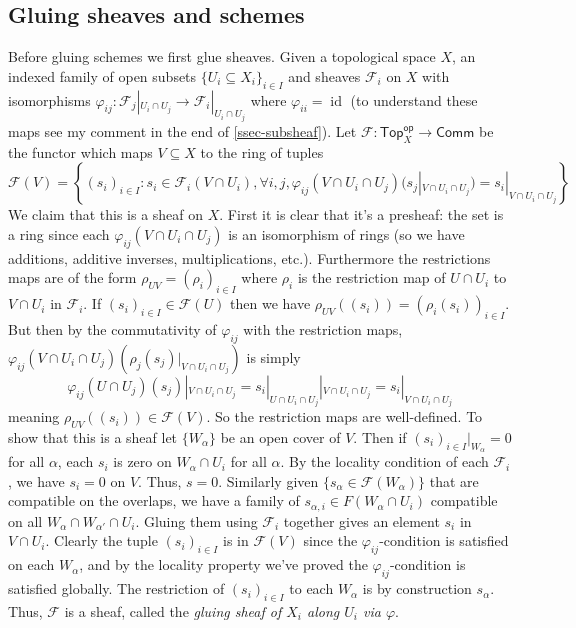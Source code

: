 \documentclass[12pt]{article}
\theoremstyle{remark}
\newcommand{\id}[0]{\operatorname{id}}
\newcommand{\Top}[0]{\mathsf{Top}}
\newcommand{\op}[0]{\mathsf{op}}
\begin{document}
	\subsection{Gluing sheaves and schemes}\label{ssec-gluing}
	Before gluing schemes we first glue sheaves. Given a topological space $X$, an indexed family of open subsets $\{U_i\subseteq X_i\}_{i\in I}$ and sheaves $\mathscr F_i$ on $X$ with isomorphisms $\varphi_{ij}:\mathscr F_j|_{U_i\cap U_j}\to \mathscr F_i|_{U_i\cap U_j}$ where $\varphi_{ii}=\id$ (to understand these maps see my comment in the end of \ref{ssec-subsheaf}). Let $\mathscr F:\Top_X^\op\to\mathsf{Comm}$ be the functor which maps $V\subseteq X$ to the ring of tuples
	\[\mathscr F(V)=\left\{(s_i)_{i\in I}:s_i\in \mathscr F_i(V\cap U_i),\forall i,j,\varphi_{ij}(V\cap U_i\cap U_j)(s_j|_{V\cap U_i\cap U_j})=s_i|_{V\cap U_i\cap U_j}\right\}\]
	We claim that this is a sheaf on $X$. First it is clear that it's a presheaf: the set is a ring since each $\varphi_{ij}(V\cap U_i\cap U_j)$ is an isomorphism of rings (so we have additions, additive inverses, multiplications, etc.). Furthermore the restrictions maps are of the form $\rho_{UV}=(\rho_i)_{i\in I}$ where $\rho_i$ is the restriction map of $U\cap U_i$ to $V\cap U_i$ in $\mathscr F_i$. If $(s_i)_{i\in I}\in \mathscr F(U)$ then we have $\rho_{UV}((s_i))=(\rho_i(s_i))_{i\in I}$. But then by the commutativity of $\varphi_{ij}$ with the restriction maps, $\varphi_{ij}(V\cap U_i\cap U_j)(\rho_j(s_j)|_{V\cap U_i\cap U_j})$ is simply 
	\[\varphi_{ij}(U\cap U_j)(s_j)|_{V\cap U_i\cap U_j}=s_i|_{U\cap U_i\cap U_j}|_{V\cap U_i\cap U_j}=s_i|_{V\cap U_i\cap U_j}\]
	meaning $\rho_{UV}((s_i))\in \mathscr F(V)$. So the restriction maps are well-defined. To show that this is a sheaf let $\{W_\alpha\}$ be an open cover of $V$. Then if $(s_i)_{i\in I}|_{W_\alpha}=0$ for all $\alpha$, each $s_i$ is zero on $W_\alpha\cap U_i$ for all $\alpha$. By the locality condition of each $\mathscr F_i$, we have $s_i=0$ on $V$. Thus, $s=0$. Similarly given $\{s_\alpha\in \mathscr F(W_\alpha)\}$ that are compatible on the overlaps, we have a family of $s_{\alpha, i}\in F(W_\alpha\cap U_i)$ compatible on all $W_\alpha\cap W_{\alpha'}\cap U_i$. Gluing them using $\mathscr F_i$ together gives an element $s_i$ in $V\cap U_i$. Clearly the tuple $(s_i)_{i\in I}$ is in $\mathscr F(V)$ since the $\varphi_{ij}$-condition is satisfied on each $W_\alpha$, and by the locality property we've proved the $\varphi_{ij}$-condition is satisfied globally. The restriction of $(s_i)_{i\in I}$ to each $W_\alpha$ is by construction $s_{\alpha}$. Thus, $\mathscr F$ is a sheaf, called the \textit{gluing sheaf of $X_i$ along $U_i$ via $\varphi$}.
	
\end{document}
